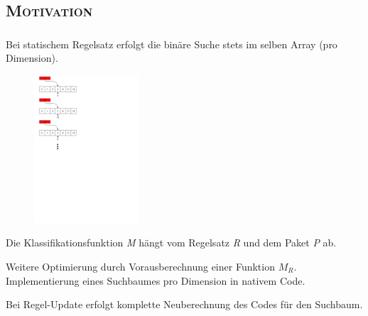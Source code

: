 \documentclass[xcolor=x11names,compress]{beamer}
\renewcommand{\(}{\begin{columns}}
\renewcommand{\)}{\end{columns}}
\newcommand{\<}[1]{\begin{column}{#1}}
\renewcommand{\>}{\end{column}}
\begin{document}
\subsection{\scshape Motivation}
\begin{frame}
  \frametitle{\insertsubsection}
  Bei statischem Regelsatz erfolgt die binäre Suche stets im selben Array (pro Dimension).\\
  \begin{figure}
  \centering
  \includegraphics[height=5.5cm]{figures/matching_process}
  \end{figure}
\end{frame}

\begin{frame}
  \begin{tcolorbox}[colback=yellow!5!white,colframe=yellow!75!black,title=Erinnerung,drop fuzzy shadow]
  Die Klassifikationsfunktion \textit{M} hängt vom Regelsatz \textit{R} und dem Paket \textit{P} ab.
  \end{tcolorbox}
  \pause
  \begin{tcolorbox}[colback=blue!5!white,colframe=blue!75!black,title=Idee,drop fuzzy shadow]
  Weitere Optimierung durch Vorausberechnung einer Funktion $M_R$.\\
  Implementierung eines Suchbaumes pro Dimension in nativem Code.
  \end{tcolorbox}
  \pause
  \begin{tcolorbox}[colback=red!5!white,colframe=red!75!black,title=Nachteil,drop fuzzy shadow]
  Bei Regel-Update erfolgt komplette Neuberechnung des Codes für den Suchbaum.
  \end{tcolorbox}
\end{frame}
\end{document}
